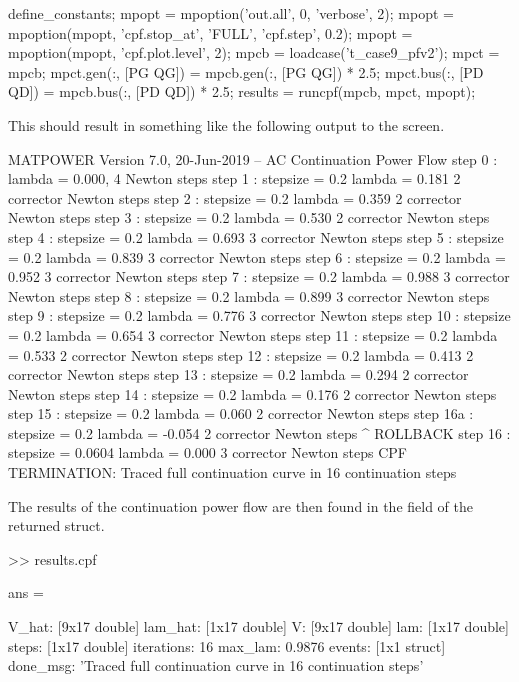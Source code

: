 \documentclass[12pt]{article}
\newcommand{\code}[1]{{\relsize{-0.5}{\tt{{#1}}}}}  %
\newcommand{\results}[0]{\code{results}}
\numberwithin{equation}{section}
\numberwithin{table}{section}
\numberwithin{figure}{section}
\begin{document}
\begin{Code}
define_constants;
mpopt = mpoption('out.all', 0, 'verbose', 2);
mpopt = mpoption(mpopt, 'cpf.stop_at', 'FULL', 'cpf.step', 0.2);
mpopt = mpoption(mpopt, 'cpf.plot.level', 2);
mpcb = loadcase('t_case9_pfv2');                    %
mpct = mpcb;                                        %
mpct.gen(:, [PG QG]) = mpcb.gen(:, [PG QG]) * 2.5;  %
mpct.bus(:, [PD QD]) = mpcb.bus(:, [PD QD]) * 2.5;  %
results = runcpf(mpcb, mpct, mpopt);
\end{Code}
This should result in something like the following output to the screen.
\begin{Code}
MATPOWER Version 7.0, 20-Jun-2019 -- AC Continuation Power Flow
step   0  :                      lambda =  0.000,  4 Newton steps
step   1  : stepsize = 0.2       lambda =  0.181   2 corrector Newton steps
step   2  : stepsize = 0.2       lambda =  0.359   2 corrector Newton steps
step   3  : stepsize = 0.2       lambda =  0.530   2 corrector Newton steps
step   4  : stepsize = 0.2       lambda =  0.693   3 corrector Newton steps
step   5  : stepsize = 0.2       lambda =  0.839   3 corrector Newton steps
step   6  : stepsize = 0.2       lambda =  0.952   3 corrector Newton steps
step   7  : stepsize = 0.2       lambda =  0.988   3 corrector Newton steps
step   8  : stepsize = 0.2       lambda =  0.899   3 corrector Newton steps
step   9  : stepsize = 0.2       lambda =  0.776   3 corrector Newton steps
step  10  : stepsize = 0.2       lambda =  0.654   3 corrector Newton steps
step  11  : stepsize = 0.2       lambda =  0.533   2 corrector Newton steps
step  12  : stepsize = 0.2       lambda =  0.413   2 corrector Newton steps
step  13  : stepsize = 0.2       lambda =  0.294   2 corrector Newton steps
step  14  : stepsize = 0.2       lambda =  0.176   2 corrector Newton steps
step  15  : stepsize = 0.2       lambda =  0.060   2 corrector Newton steps
step  16a : stepsize = 0.2       lambda = -0.054   2 corrector Newton steps ^ ROLLBACK
step  16  : stepsize = 0.0604    lambda =  0.000   3 corrector Newton steps
CPF TERMINATION: Traced full continuation curve in 16 continuation steps
\end{Code}
The results of the continuation power flow are then found in the \code{cpf} field of the returned \results{} struct.
\begin{Code}
>> results.cpf

ans = 

         V_hat: [9x17 double]
       lam_hat: [1x17 double]
             V: [9x17 double]
           lam: [1x17 double]
         steps: [1x17 double]
    iterations: 16
       max_lam: 0.9876
        events: [1x1 struct]
      done_msg: 'Traced full continuation curve in 16 continuation steps'
\end{Code}
\end{document}
